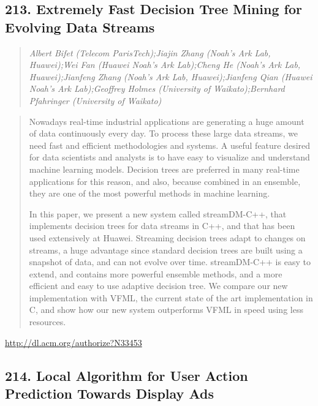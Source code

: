 \documentclass{article}
\begin{document}
\subsection{213. Extremely Fast Decision Tree Mining for Evolving Data Streams}

\begin{quote}
\footnotesize{\textit{Albert Bifet (Telecom ParisTech);Jiajin Zhang (Noah's Ark Lab, Huawei);Wei Fan (Huawei Noah’s Ark Lab);Cheng He (Noah's Ark Lab, Huawei);Jianfeng Zhang (Noah's Ark Lab, Huawei);Jianfeng Qian (Huawei Noah's Ark Lab);Geoffrey Holmes (University of Waikato);Bernhard Pfahringer (University of Waikato)}}

\end{quote}

\begin{quote}
Nowadays real-time industrial applications are generating a huge amount of data continuously every day. To process these large data streams, we need fast and efficient methodologies and systems. A useful feature desired for data scientists and analysts is to have easy to visualize and understand machine learning models. Decision trees are preferred in many real-time applications for this reason, and also, because combined in an ensemble, they are one of the most powerful methods in machine learning.







  In this paper, we present a new system called streamDM-C++, that implements decision trees for data streams in C++, and that has been used extensively at Huawei. Streaming decision trees adapt to changes on streams, a huge advantage since standard decision trees are built using a snapshot of data, and can not evolve over time. streamDM-C++ is easy to extend, and contains more powerful ensemble methods, and a more efficient and easy to use adaptive decision tree. We compare our new implementation with VFML, the current state of the art implementation in C, and show how our new system outperforms VFML in speed using less resources.
\end{quote}

\href{http://dl.acm.org/authorize?N33453}{http://dl.acm.org/authorize?N33453}

\subsection{214. Local Algorithm for User Action Prediction Towards Display Ads}
\end{document}
